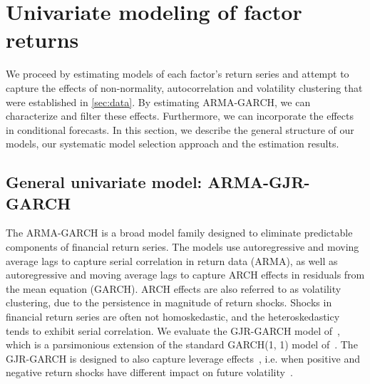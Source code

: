 

\section{Univariate modeling of factor returns} %
\label{sec:univariate_modeling}

We proceed by estimating models of each factor's return series and attempt to capture the effects of non-normality, autocorrelation and volatility clustering that were established in \autoref{sec:data}. By estimating ARMA-GARCH, we can characterize and filter these effects. Furthermore, we can incorporate the effects in conditional forecasts. In this section, we describe the general structure of our models, our systematic model selection approach and the estimation results.

\subsection{General univariate model: ARMA-GJR-GARCH} %
\label{sub:general_univariate_model_gjr_garch}

The ARMA-GARCH is a broad model family designed to eliminate predictable components of financial return series. The models use autoregressive and moving average lags to capture serial correlation in return data (ARMA), as well as autoregressive and moving average lags to capture ARCH effects in residuals from the mean equation (GARCH). ARCH effects are also referred to as volatility clustering, due to the persistence in magnitude of return shocks. Shocks in financial return series are often not homoskedastic, and the heteroskedasticy tends to exhibit serial correlation. We evaluate the GJR-GARCH model of~\textcite{glosten1993relation}, which is a parsimonious extension of the standard GARCH(1, 1) model of~\autocite{Bollerslev1986}. The GJR-GARCH is designed to also capture leverage effects~\autocite{glosten1993relation}, i.e. when positive and negative return shocks have different impact on future volatility~\autocite{Black1976}.


